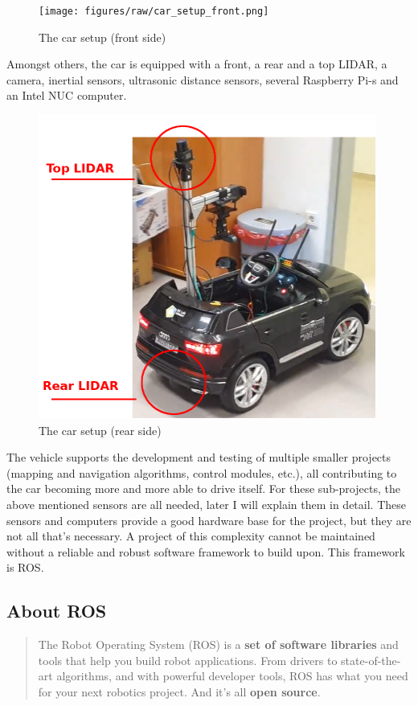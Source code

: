 \begin{figure}[!ht]
    \centering
    \texttt{[image: figures/raw/car\_setup\_front.png]}
    \caption{The car setup (front side)}
    \label{car_setup_front}
\end{figure}

Amongst others, the car is equipped with a front, a rear and a top LIDAR, a camera, inertial sensors, ultrasonic distance sensors, several Raspberry Pi-s and an Intel NUC computer.

\begin{figure}[!ht]
    \centering
    \includegraphics[height=100mm]{figures/raw/car_setup_rear.png}
    \caption{The car setup (rear side)}
    \label{car_setup_rear}
\end{figure}

The vehicle supports the development and testing of multiple smaller projects (mapping and navigation algorithms, control modules, etc.), all contributing to the car becoming more and more able to drive itself. For these sub-projects, the above mentioned sensors are all needed, later I will explain them in detail. These sensors and computers provide a good hardware base for the project, but they are not all that's necessary. A project of this complexity cannot be maintained without a reliable and robust software framework to build upon. This framework is ROS.

\subsection{About ROS}

\begin{quote}
The Robot Operating System (ROS) is a \textbf{set of software libraries} and tools that help you build robot applications. From drivers to state-of-the-art algorithms, and with powerful developer tools, ROS has what you need for your next robotics project. And it's all \textbf{open source}.
\end{quote}

